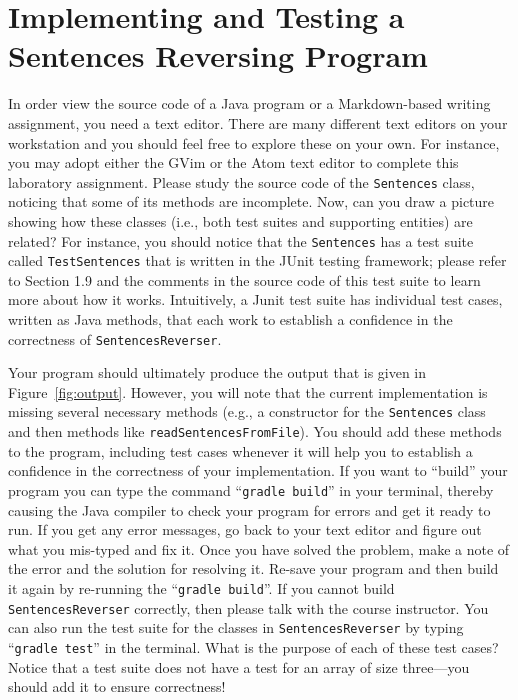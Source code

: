 \documentclass[11pt]{article}
\newcommand{\mainprogram}{\lstinline{SentencesReverser}}
\newcommand{\mainprogramhelper}{\lstinline{Sentences}}
\newcommand{\testprogram}{\lstinline{TestSentences}}
\newcommand{\gradlebuild}{\command{gradle build}}
\newcommand{\gradletest}{\command{gradle test}}
\newcommand{\command}[1]{``\lstinline{#1}''}
\newcommand{\program}[1]{\lstinline{#1}}
\newcommand{\step}[1]{``{#1}''}
\begin{document}
\section*{Implementing and Testing a Sentences Reversing Program}

In order view the source code of a Java program or a Markdown-based writing
assignment, you need a text editor. There are many different text editors on
your workstation and you should feel free to explore these on your own. For
instance, you may adopt either the GVim or the Atom text editor to complete this
laboratory assignment. Please study the source code of the \mainprogramhelper
class, noticing that some of its methods are incomplete. Now, can you draw a
picture showing how these classes (i.e., both test suites and supporting
entities) are related? For instance, you should notice that the
\mainprogramhelper{} has a test suite called \testprogram{} that is written in
the JUnit testing framework; please refer to Section 1.9 and the comments in
the source code of this test suite to learn more about how it works.
Intuitively, a Junit test suite has individual test cases, written as Java
methods, that each work to establish a confidence in the correctness of
\mainprogram{}.

Your program should ultimately produce the output that is given in
Figure~\ref{fig:output}. However, you will note that the current implementation
is missing several necessary methods (e.g., a constructor for the
\program{Sentences} class and then methods like
\program{readSentencesFromFile}). You should add these methods to the program,
including test cases whenever it will help you to establish a confidence in the
correctness of your implementation. If you want to \step{build} your program you
can type the command \gradlebuild{} in your terminal, thereby causing the Java
compiler to check your program for errors and get it ready to run. If you get
any error messages, go back to your text editor and figure out what you
mis-typed and fix it. Once you have solved the problem, make a note of the error
and the solution for resolving it. Re-save your program and then build it again
by re-running the \gradlebuild{}. If you cannot build \mainprogram{} correctly,
then please talk with the course instructor. You can also run the test suite for
the classes in \mainprogram{} by typing \gradletest{} in the terminal. What is
the purpose of each of these test cases? Notice that a test suite does not have
a test for an array of size three---you should add it to ensure correctness!
\end{document}
